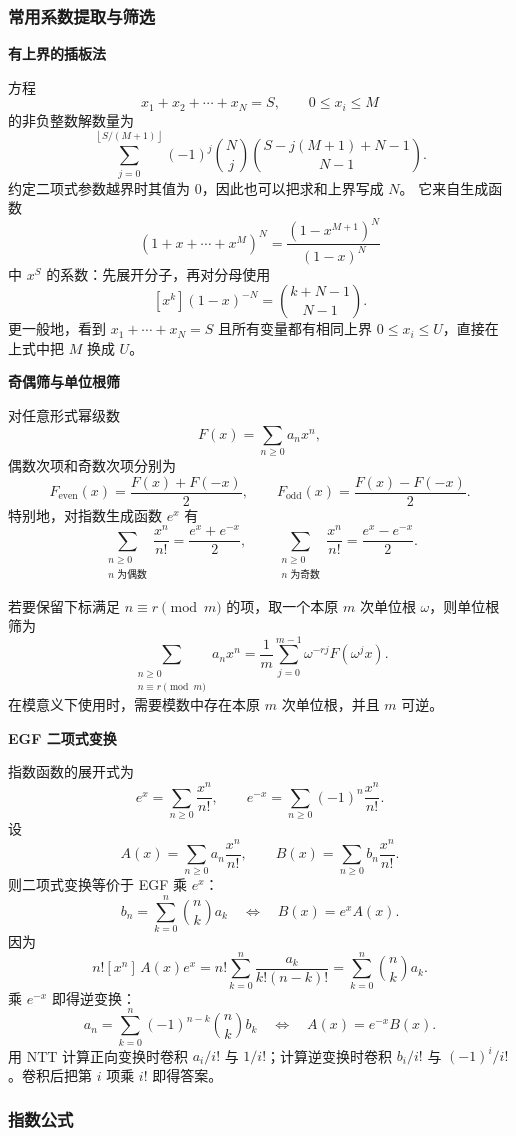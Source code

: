 \subsubsection{常用系数提取与筛选}

\textbf{有上界的插板法}

方程
\[
  x_1+x_2+\cdots+x_N=S,
  \qquad 0\le x_i\le M
\]
的非负整数解数量为
\[
  \sum_{j=0}^{\left\lfloor S/(M+1)\right\rfloor}
  (-1)^j
  \binom Nj
  \binom{S-j(M+1)+N-1}{N-1}.
\]
约定二项式参数越界时其值为 $0$，因此也可以把求和上界写成 $N$。
它来自生成函数
\[
  (1+x+\cdots+x^M)^N
  =\frac{(1-x^{M+1})^N}{(1-x)^N}
\]
中 $x^S$ 的系数：先展开分子，再对分母使用
\[
  [x^k](1-x)^{-N}=\binom{k+N-1}{N-1}.
\]
更一般地，看到 $x_1+\cdots+x_N=S$ 且所有变量都有相同上界
$0\le x_i\le U$，直接在上式中把 $M$ 换成 $U$。

\textbf{奇偶筛与单位根筛}

对任意形式幂级数
\[
  F(x)=\sum_{n\ge0}a_nx^n,
\]
偶数次项和奇数次项分别为
\[
  F_{\mathrm{even}}(x)=\frac{F(x)+F(-x)}2,
  \qquad
  F_{\mathrm{odd}}(x)=\frac{F(x)-F(-x)}2.
\]
特别地，对指数生成函数 $e^x$ 有
\[
  \sum_{\substack{n\ge0\\n\text{ 为偶数}}}\frac{x^n}{n!}
  =\frac{e^x+e^{-x}}2,
  \qquad
  \sum_{\substack{n\ge0\\n\text{ 为奇数}}}\frac{x^n}{n!}
  =\frac{e^x-e^{-x}}2.
\]

若要保留下标满足 $n\equiv r\pmod m$ 的项，取一个本原 $m$ 次单位根
$\omega$，则单位根筛为
\[
  \sum_{\substack{n\ge0\\n\equiv r\pmod m}}a_nx^n
  =\frac1m\sum_{j=0}^{m-1}\omega^{-rj}F(\omega^jx).
\]
在模意义下使用时，需要模数中存在本原 $m$ 次单位根，并且 $m$ 可逆。

\textbf{EGF 二项式变换}

指数函数的展开式为
\[
  e^x=\sum_{n\ge0}\frac{x^n}{n!},
  \qquad
  e^{-x}=\sum_{n\ge0}(-1)^n\frac{x^n}{n!}.
\]
设
\[
  A(x)=\sum_{n\ge0}a_n\frac{x^n}{n!},
  \qquad
  B(x)=\sum_{n\ge0}b_n\frac{x^n}{n!}.
\]
则二项式变换等价于 EGF 乘 $e^x$：
\[
  \boxed{
    b_n=\sum_{k=0}^n\binom nk a_k
    \quad\Longleftrightarrow\quad
    B(x)=e^xA(x)
  }.
\]
因为
\[
  n![x^n]\,A(x)e^x
  =n!\sum_{k=0}^n\frac{a_k}{k!(n-k)!}
  =\sum_{k=0}^n\binom nk a_k.
\]
乘 $e^{-x}$ 即得逆变换：
\[
  \boxed{
    a_n=\sum_{k=0}^n(-1)^{n-k}\binom nk b_k
    \quad\Longleftrightarrow\quad
    A(x)=e^{-x}B(x)
  }.
\]
用 NTT 计算正向变换时卷积 $a_i/i!$ 与 $1/i!$；计算逆变换时卷积
$b_i/i!$ 与 $(-1)^i/i!$。卷积后把第 $i$ 项乘 $i!$ 即得答案。

\subsubsection{指数公式}

